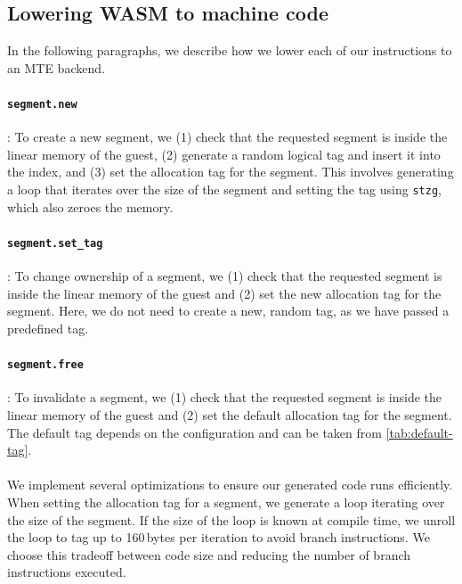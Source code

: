 \subsection{Lowering \ac{WASM} to machine code}
\label{subsec:lowering-wasm-to-machine-code}

In the following paragraphs, we describe how we lower each of our instructions to an \ac{MTE} backend.

\paragraph{\texttt{segment.new}}: To create a new segment, we (1) check that the requested segment is inside the linear memory of the guest, (2) generate a random logical tag and insert it into the index, and (3) set the allocation tag for the segment.
This involves generating a loop that iterates over the size of the segment and setting the tag using \texttt{stzg}, which also zeroes the memory.

\paragraph{\texttt{segment.set\_tag}}: To change ownership of a segment, we (1) check that the requested segment is inside the linear memory of the guest and (2) set the new allocation tag for the segment.
Here, we do not need to create a new, random tag, as we have passed a predefined tag.

\paragraph{\texttt{segment.free}}: To invalidate a segment, we (1) check that the requested segment is inside the linear memory of the guest and (2) set the default allocation tag for the segment.
The default tag depends on the configuration and can be taken from \cref{tab:default-tag}.

\paragraph{}
We implement several optimizations to ensure our generated code runs efficiently.
When setting the allocation tag for a segment, we generate a loop iterating over the size of the segment.
If the size of the loop is known at compile time, we unroll the loop to tag up to 160\,bytes per iteration to avoid branch instructions.
We choose this tradeoff between code size and reducing the number of branch instructions executed.

